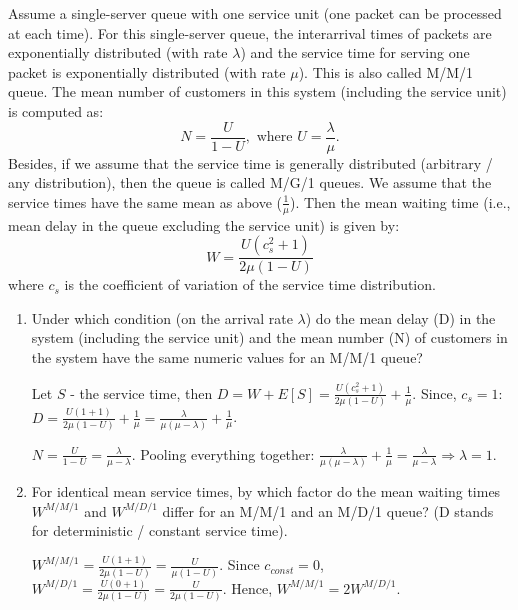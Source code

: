 \documentclass{homework}
\begin{document}
\exercise*
Assume a single-server queue with one service unit (one packet can be processed at each time). For this single-server queue, the interarrival times of packets are exponentially distributed (with rate $\lambda$) and the service time for serving one packet is exponentially distributed (with rate $\mu$). This is also called M/M/1 queue. The mean number of customers in this system (including the service unit) is computed as:
\[N = \frac{U}{1 - U}, \text{ where } U = \frac{\lambda}{\mu}.\]
Besides, if we assume that the service time is generally distributed (arbitrary / any distribution), then the queue is called M/G/1 queues. We assume that the service times have the same mean as above ($\frac{1}{\mu}$). Then the mean waiting time (i.e., mean delay in the queue excluding the service unit) is given by: \[W = \frac{U(c_s^2 + 1)}{2\mu(1-U)}\] where $c_s$ is the coefficient of variation of the service time distribution.
\begin{enumerate}[label=(\alph*)]
\item Under which condition (on the arrival rate $\lambda$) do the mean delay (D) in the system (including the service unit) and the mean number (N) of customers in the system have the same numeric values for an M/M/1 queue?

Let $S$ - the service time, then $D = W + E[S] = \frac{U(c_s^2 + 1)}{2\mu(1-U)} + \frac{1}{\mu}$. \newline Since, $c_s = 1$: $D = \frac{U(1 + 1)}{2\mu(1-U)} + \frac{1}{\mu} =  \frac{\lambda}{\mu(\mu - \lambda)} + \frac{1}{\mu}$.

$N = \frac{U}{1 - U} = \frac{\lambda}{\mu - \lambda}$. Pooling everything together: $\frac{\lambda}{\mu(\mu - \lambda)} + \frac{1}{\mu} = \frac{\lambda}{\mu - \lambda} \Rightarrow \lambda = 1$.
\item For identical mean service times, by which factor do the mean waiting times $W^{M/M/1}$ and $W^{M/D/1}$ differ for an M/M/1 and an M/D/1 queue? (D stands for deterministic / constant service time).

$W^{M/M/1} = \frac{U(1 + 1)}{2\mu(1-U)} = \frac{U}{\mu(1-U)}$.
\newline Since $c_{const} = 0$, $W^{M/D/1} = \frac{U(0 + 1)}{2\mu(1-U)} = \frac{U}{2\mu(1-U)}$.
\newline Hence, $W^{M/M/1} = 2W^{M/D/1}$.

\end{enumerate}
\end{document}

